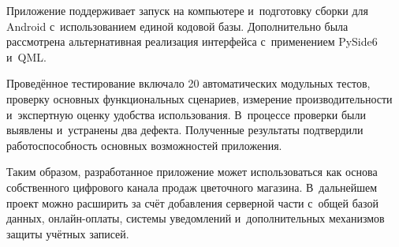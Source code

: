 \documentclass[14pt,a4paper]{extarticle}
\begin{document}
Приложение поддерживает запуск на компьютере и~подготовку сборки для Android с~использованием единой кодовой базы. Дополнительно была рассмотрена альтернативная реализация интерфейса с~применением PySide6 и~QML.



Проведённое тестирование включало 20 автоматических модульных тестов, проверку основных функциональных сценариев, измерение производительности и~экспертную оценку удобства использования. В~процессе проверки были выявлены и~устранены два дефекта. Полученные результаты подтвердили работоспособность основных возможностей приложения.



Таким образом, разработанное приложение может использоваться как основа собственного цифрового канала продаж цветочного магазина. В~дальнейшем проект можно расширить за счёт добавления серверной части с~общей базой данных, онлайн-оплаты, системы уведомлений и~дополнительных механизмов защиты учётных записей.



\clearpage
\end{document}
